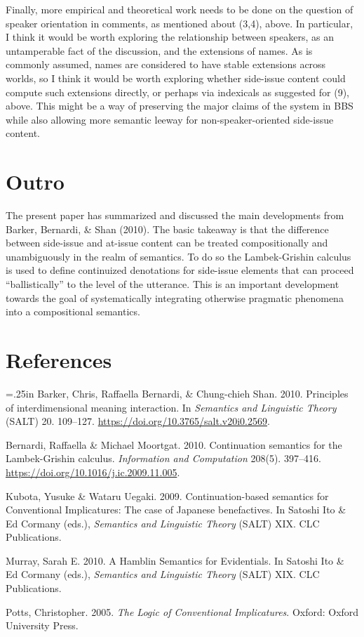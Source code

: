 \documentclass[12pt]{article}
\makeatletter
\newcommand{\hangpara}[2]{\hangindent#1\hangafter#2\noindent}
\newenvironment{hangparas}[2]{\setlength{\parindent}{\z@}%
  \everypar={\hangpara{#1}{#2}}}{\par}
\makeatother
\begin{document}
Finally, more empirical and theoretical work needs to be done on the question of speaker orientation in comments, as mentioned about (3,4), above. In particular, I think it would be worth exploring the relationship between speakers, as an untamperable fact of the discussion, and the extensions of names. As is commonly assumed, names are considered to have stable extensions across worlds, so I think it would be worth exploring whether side-issue content could compute such extensions directly, or perhaps via indexicals as suggested for (9), above. This might be a way of preserving the major claims of the system in BBS while also allowing more semantic leeway for non-speaker-oriented side-issue content.

\section{Outro}

The present paper has summarized and discussed the main developments from Barker, Bernardi, \& Shan (2010). The basic takeaway is that the difference between side-issue and at-issue content can be treated compositionally and unambiguously in the realm of semantics. To do so the Lambek-Grishin calculus is used to define continuized denotations for side-issue elements that can proceed ``ballistically'' to the level of the utterance. This is an important development towards the goal of systematically integrating otherwise pragmatic phenomena into a compositional semantics.

\section{References}

\begin{hangparas}{.25in}{1}
\small
Barker, Chris, Raffaella Bernardi, \& Chung-chieh Shan. 2010. Principles of interdimensional meaning interaction. In \textit{Semantics and Linguistic Theory} (SALT) 20. 109--127. \url{https://doi.org/10.3765/salt.v20i0.2569}.

Bernardi, Raffaella \& Michael Moortgat. 2010. Continuation semantics for the Lambek-Grishin calculus. \textit{Information and Computation} 208(5). 397--416. \url{https://doi.org/10.1016/j.ic.2009.11.005}.

Kubota, Yusuke \& Wataru Uegaki. 2009. Continuation-based semantics for Conventional Implicatures: The case of Japanese benefactives. In Satoshi Ito \& Ed Cormany (eds.), \textit{Semantics and Linguistic Theory} (SALT) XIX. CLC Publications.

Murray, Sarah E. 2010. A Hamblin Semantics for Evidentials. In Satoshi Ito \& Ed Cormany (eds.), \textit{Semantics and Linguistic Theory} (SALT) XIX. CLC Publications.

Potts, Christopher. 2005. \textit{The Logic of Conventional Implicatures}. Oxford: Oxford University Press.
\end{hangparas}
\end{document}
